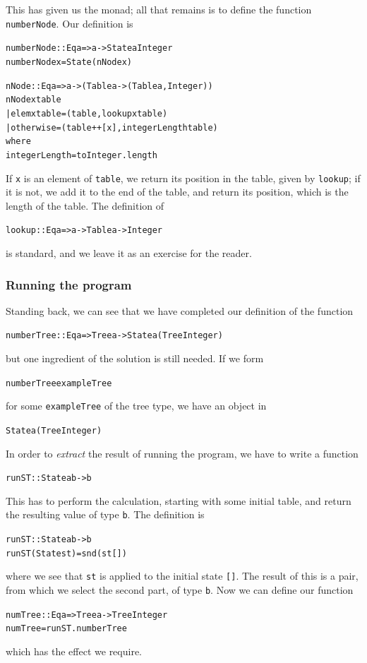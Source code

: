 This has given us the monad; all that remains is to define the function 
\texttt{numberNode}. Our definition is
\begin{alltt}
numberNode :: Eq a => a -> State a Integer
numberNode x = State (nNode x)

nNode :: Eq a => a -> (Table a -> (Table a , Integer))
nNode x table
  | elem x table        = (table      , lookup x table)
  | otherwise           = (table++[x] , integerLength table)
    where
    integerLength = toInteger.length
\end{alltt}
If \texttt{x} is an element of \texttt{table}, we return its position in the table,
given by \texttt{lookup}; if it is not, we add it to the end of the table, and
return its position, which is the length of the table. The definition
of 
\begin{alltt}
lookup :: Eq a => a -> Table a -> Integer
\end{alltt}
is standard, and we leave it as an exercise for the reader.

\subsubsection*{Running the program}

Standing back, we can see that we have completed our definition of the
function
\begin{alltt}
numberTree :: Eq a => Tree a -> State a (Tree Integer)
\end{alltt}
but one ingredient of the solution is still needed. If we form
\begin{alltt}
numberTree exampleTree
\end{alltt}
for some \texttt{exampleTree} of the tree type, we have an object in 
\begin{alltt}
State a (Tree Integer)
\end{alltt}
In order to \emph{extract} the result of running the program, we have to write a function
\begin{alltt}
runST :: State a b -> b
\end{alltt}
This has to perform the calculation, starting with some initial table, and
return the resulting value of type \texttt{b}. The definition is
\begin{alltt}
runST :: State a b -> b
runST (State st) = snd (st [])
\end{alltt}
where we see that \texttt{st} is applied to the initial state \texttt{[]}. The result
of this is a pair, from which we select the second part, of type \texttt{b}.
Now we can define our function
\begin{alltt}
numTree :: Eq a => Tree a -> Tree Integer
numTree = runST . numberTree
\end{alltt}
which has the effect we require.

